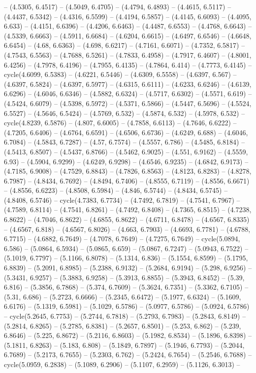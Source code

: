 -- (4.5305, 6.4517) -- (4.5049, 6.4705) -- (4.4794, 6.4893) -- (4.4615, 6.5117) -- (4.4437, 6.5342) -- (4.4316, 6.5599) -- (4.4194, 6.5857) -- (4.4145, 6.6093) -- (4.4095, 6.633) -- (4.4151, 6.6396) -- (4.4206, 6.6463) -- (4.4487, 6.6553) -- (4.4768, 6.6643) -- (4.5339, 6.6663) -- (4.5911, 6.6684) -- (4.6204, 6.6615) -- (4.6497, 6.6546) -- (4.6648, 6.6454) -- (4.68, 6.6363) -- (4.698, 6.6217) -- (4.7161, 6.6071) -- (4.7352, 6.5817) -- (4.7543, 6.5563) -- (4.7688, 6.5261) -- (4.7833, 6.4958) -- (4.7917, 6.4607) -- (4.8001, 6.4256) -- (4.7978, 6.4196) -- (4.7955, 6.4135) -- (4.7864, 6.414) -- (4.7773, 6.4145) -- cycle(4.6099, 6.5383) -- (4.6221, 6.5446) -- (4.6309, 6.5558) -- (4.6397, 6.567) -- (4.6397, 6.5824) -- (4.6397, 6.5977) -- (4.6315, 6.6111) -- (4.6233, 6.6246) -- (4.6139, 6.6296) -- (4.6046, 6.6346) -- (4.5882, 6.6324) -- (4.5717, 6.6302) -- (4.5571, 6.619) -- (4.5424, 6.6079) -- (4.5398, 6.5972) -- (4.5371, 6.5866) -- (4.5447, 6.5696) -- (4.5524, 6.5527) -- (4.5646, 6.5424) -- (4.5769, 6.532) -- (4.5874, 6.532) -- (4.5978, 6.532) -- cycle(4.8239, 6.5876) -- (4.807, 6.6005) -- (4.7858, 6.6113) -- (4.7646, 6.6222) -- (4.7205, 6.6406) -- (4.6764, 6.6591) -- (4.6506, 6.6736) -- (4.6249, 6.688) -- (4.6046, 6.7084) -- (4.5843, 6.7287) -- (4.57, 6.7574) -- (4.5557, 6.786) -- (4.5485, 6.8184) -- (4.5413, 6.8507) -- (4.5437, 6.8766) -- (4.5462, 6.9025) -- (4.551, 6.9162) -- (4.5559, 6.93) -- (4.5904, 6.9299) -- (4.6249, 6.9298) -- (4.6546, 6.9235) -- (4.6842, 6.9173) -- (4.7185, 6.9008) -- (4.7529, 6.8843) -- (4.7826, 6.8563) -- (4.8123, 6.8283) -- (4.8278, 6.7987) -- (4.8434, 6.7692) -- (4.8494, 6.7406) -- (4.8555, 6.7119) -- (4.8556, 6.6671) -- (4.8556, 6.6223) -- (4.8508, 6.5984) -- (4.846, 6.5744) -- (4.8434, 6.5745) -- (4.8408, 6.5746) -- cycle(4.7383, 6.7734) -- (4.7492, 6.7819) -- (4.7541, 6.7967) -- (4.7589, 6.8114) -- (4.7541, 6.8261) -- (4.7492, 6.8408) -- (4.7365, 6.8515) -- (4.7238, 6.8622) -- (4.7046, 6.8622) -- (4.6855, 6.8622) -- (4.6711, 6.8478) -- (4.6567, 6.8335) -- (4.6567, 6.818) -- (4.6567, 6.8026) -- (4.663, 6.7903) -- (4.6693, 6.7781) -- (4.6788, 6.7715) -- (4.6882, 6.7649) -- (4.7078, 6.7649) -- (4.7275, 6.7649) -- cycle(5.0894, 6.586) -- (5.0864, 6.5934) -- (5.0865, 6.659) -- (5.0867, 6.7247) -- (5.0943, 6.7522) -- (5.1019, 6.7797) -- (5.1166, 6.8078) -- (5.1314, 6.836) -- (5.1554, 6.8599) -- (5.1795, 6.8839) -- (5.2091, 6.8985) -- (5.2388, 6.9132) -- (5.2684, 6.9194) -- (5.298, 6.9256) -- (5.3431, 6.9257) -- (5.3883, 6.9258) -- (5.3913, 6.8855) -- (5.3943, 6.8452) -- (5.39, 6.816) -- (5.3856, 6.7868) -- (5.374, 6.7609) -- (5.3624, 6.7351) -- (5.3362, 6.7105) -- (5.31, 6.686) -- (5.2723, 6.6666) -- (5.2345, 6.6472) -- (5.1977, 6.6324) -- (5.1609, 6.6176) -- (5.1319, 6.5981) -- (5.1029, 6.5786) -- (5.0977, 6.5786) -- (5.0924, 6.5786) -- cycle(5.2645, 6.7753) -- (5.2744, 6.7818) -- (5.2793, 6.7983) -- (5.2843, 6.8149) -- (5.2814, 6.8265) -- (5.2785, 6.8381) -- (5.2657, 6.8501) -- (5.253, 6.862) -- (5.239, 6.8646) -- (5.225, 6.8672) -- (5.2116, 6.8603) -- (5.1982, 6.8534) -- (5.1896, 6.8398) -- (5.1811, 6.8263) -- (5.183, 6.808) -- (5.1849, 6.7897) -- (5.1946, 6.7793) -- (5.2044, 6.7689) -- (5.2173, 6.7655) -- (5.2303, 6.762) -- (5.2424, 6.7654) -- (5.2546, 6.7688) -- cycle(5.0959, 6.2838) -- (5.1089, 6.2906) -- (5.1107, 6.2959) -- (5.1126, 6.3013) -- 